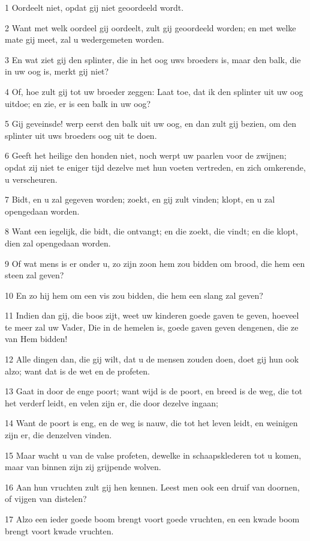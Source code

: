\par 1 Oordeelt niet, opdat gij niet geoordeeld wordt.
\par 2 Want met welk oordeel gij oordeelt, zult gij geoordeeld worden; en met welke mate gij meet, zal u wedergemeten worden.
\par 3 En wat ziet gij den splinter, die in het oog uws broeders is, maar den balk, die in uw oog is, merkt gij niet?
\par 4 Of, hoe zult gij tot uw broeder zeggen: Laat toe, dat ik den splinter uit uw oog uitdoe; en zie, er is een balk in uw oog?
\par 5 Gij geveinsde! werp eerst den balk uit uw oog, en dan zult gij bezien, om den splinter uit uws broeders oog uit te doen.
\par 6 Geeft het heilige den honden niet, noch werpt uw paarlen voor de zwijnen; opdat zij niet te eniger tijd dezelve met hun voeten vertreden, en zich omkerende, u verscheuren.
\par 7 Bidt, en u zal gegeven worden; zoekt, en gij zult vinden; klopt, en u zal opengedaan worden.
\par 8 Want een iegelijk, die bidt, die ontvangt; en die zoekt, die vindt; en die klopt, dien zal opengedaan worden.
\par 9 Of wat mens is er onder u, zo zijn zoon hem zou bidden om brood, die hem een steen zal geven?
\par 10 En zo hij hem om een vis zou bidden, die hem een slang zal geven?
\par 11 Indien dan gij, die boos zijt, weet uw kinderen goede gaven te geven, hoeveel te meer zal uw Vader, Die in de hemelen is, goede gaven geven dengenen, die ze van Hem bidden!
\par 12 Alle dingen dan, die gij wilt, dat u de mensen zouden doen, doet gij hun ook alzo; want dat is de wet en de profeten.
\par 13 Gaat in door de enge poort; want wijd is de poort, en breed is de weg, die tot het verderf leidt, en velen zijn er, die door dezelve ingaan;
\par 14 Want de poort is eng, en de weg is nauw, die tot het leven leidt, en weinigen zijn er, die denzelven vinden.
\par 15 Maar wacht u van de valse profeten, dewelke in schaapsklederen tot u komen, maar van binnen zijn zij grijpende wolven.
\par 16 Aan hun vruchten zult gij hen kennen. Leest men ook een druif van doornen, of vijgen van distelen?
\par 17 Alzo een ieder goede boom brengt voort goede vruchten, en een kwade boom brengt voort kwade vruchten.

